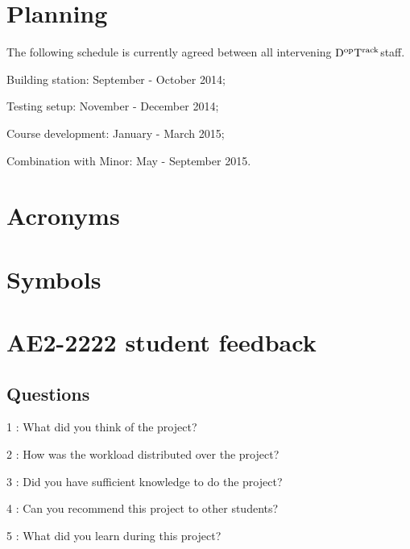 \documentclass[11pt,a4paper,oneside]{article}
\newcommand{\GroundStationName}{${\rm D^{\rm op}T^{\rm rack}}$}
\newcommand{\listskip}{0pt}
\newenvironment{description*}
{\begin{description}
  \setlength{\itemsep}{\listskip}
  \setlength{\parskip}{\listskip}
  \setlength{\parsep}{\listskip}}
{\end{description}}
\begin{document}
\section{Planning}

The following schedule is currently agreed between all intervening \GroundStationName staff.

\begin{description*}
\item[Building station:] September - October 2014;
\item[Testing setup:] November - December 2014;
\item[Course development:] January - March 2015;
\item[Combination with Minor:] May - September 2015.
\end{description*}



\ifdefined\UseAcronyms
  \ifdefined\IncludeAcronymList
    \newpage
    \section*{Acronyms}
  \fi
  
\fi


\ifdefined\UseSymbols
  \ifdefined\IncludeAcronymList
    \newpage
    \section*{Symbols}
  \fi
  
\fi




\appendix

\newpage
\section{AE2-2222 student feedback} \label{sec:appendixA}

\subsection{Questions}

\begin{description*}
\item[1]: What did you think of the project?
\item[2]: How was the workload distributed over the project?
\item[3]: Did you have sufficient knowledge to do the project?
\item[4]: Can you recommend this project to other students?
\item[5]: What did you learn during this project?
\end{description*}
\end{document}
